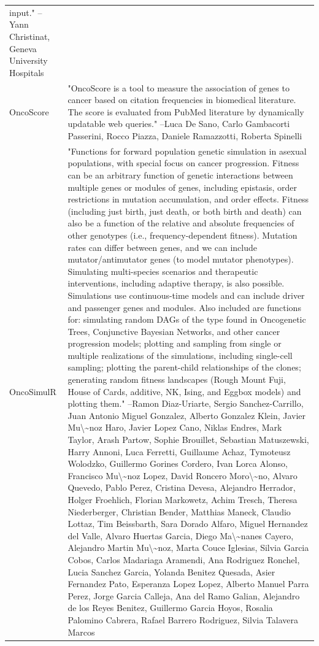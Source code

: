 \begin{longtable}[t]{l>{\raggedright\arraybackslash}p{25em}}
input." --Yann Christinat, Geneva University Hospitals\\
\addlinespace
OncoScore & "OncoScore is a tool to measure the association of genes to
cancer based on citation frequencies in biomedical literature.
The score is evaluated from PubMed literature by dynamically
updatable web queries." --Luca De Sano, Carlo Gambacorti Passerini, Rocco Piazza, Daniele Ramazzotti, Roberta Spinelli\\
OncoSimulR & "Functions for forward population genetic simulation in
asexual populations, with special focus on cancer progression.
Fitness can be an arbitrary function of genetic interactions
between multiple genes or modules of genes, including
epistasis, order restrictions in mutation accumulation, and
order effects. Fitness (including just birth, just death, or
both birth and death) can also be a function of the relative
and absolute frequencies of other genotypes (i.e.,
frequency-dependent fitness). Mutation rates can differ between
genes, and we can include mutator/antimutator genes (to model
mutator phenotypes). Simulating multi-species scenarios and
therapeutic interventions, including adaptive therapy, is also
possible. Simulations use continuous-time models and can
include driver and passenger genes and modules. Also included
are functions for: simulating random DAGs of the type found in
Oncogenetic Trees, Conjunctive Bayesian Networks, and other
cancer progression models; plotting and sampling from single or
multiple realizations of the simulations, including single-cell
sampling; plotting the parent-child relationships of the
clones; generating random fitness landscapes (Rough Mount Fuji,
House of Cards, additive, NK, Ising, and Eggbox models) and
plotting them." --Ramon Diaz-Uriarte, Sergio Sanchez-Carrillo, Juan Antonio Miguel Gonzalez, Alberto Gonzalez Klein, Javier Mu\textbackslash{}\textasciitilde{}noz Haro, Javier Lopez Cano, Niklas Endres, Mark Taylor, Arash Partow, Sophie Brouillet, Sebastian Matuszewski, Harry Annoni, Luca Ferretti, Guillaume Achaz, Tymoteusz Wolodzko, Guillermo Gorines Cordero, Ivan Lorca Alonso, Francisco Mu\textbackslash{}\textasciitilde{}noz Lopez, David Roncero Moro\textbackslash{}\textasciitilde{}no, Alvaro Quevedo, Pablo Perez, Cristina Devesa, Alejandro Herrador, Holger Froehlich, Florian Markowetz, Achim Tresch, Theresa Niederberger, Christian Bender, Matthias Maneck, Claudio Lottaz, Tim Beissbarth, Sara Dorado Alfaro, Miguel Hernandez del Valle, Alvaro Huertas Garcia, Diego Ma\textbackslash{}\textasciitilde{}nanes Cayero, Alejandro Martin Mu\textbackslash{}\textasciitilde{}noz, Marta Couce Iglesias, Silvia Garcia Cobos, Carlos Madariaga Aramendi, Ana Rodriguez Ronchel, Lucia Sanchez Garcia, Yolanda Benitez Quesada, Asier Fernandez Pato, Esperanza Lopez Lopez, Alberto Manuel Parra Perez, Jorge Garcia Calleja, Ana del Ramo Galian, Alejandro de los Reyes Benitez, Guillermo Garcia Hoyos, Rosalia Palomino Cabrera, Rafael Barrero Rodriguez, Silvia Talavera Marcos\\

\end{longtable}
